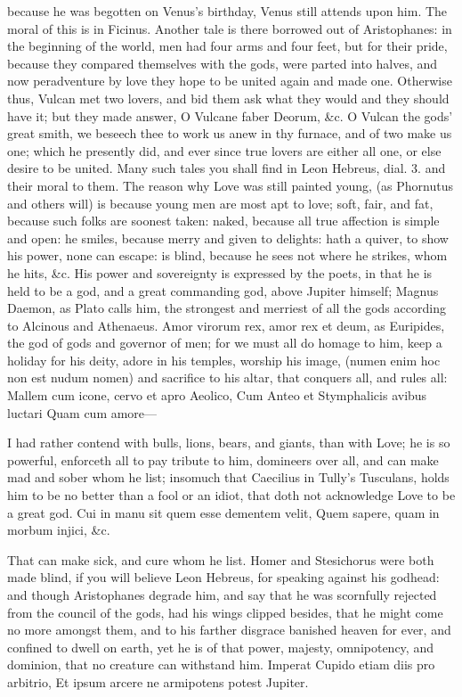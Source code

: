 {because he was begotten on Venus's birthday, Venus still attends upon
him. The moral of this is in Ficinus. Another tale is there
borrowed out of Aristophanes: in the beginning of the world, men
had four arms and four feet, but for their pride, because they compared
themselves with the gods, were parted into halves, and now peradventure
by love they hope to be united again and made one. Otherwise thus,
Vulcan met two lovers, and bid them ask what they would and they
should have it; but they made answer, O Vulcane faber Deorum, \&c. O
Vulcan the gods' great smith, we beseech thee to work us anew in thy
furnace, and of two make us one; which he presently did, and ever since
true lovers are either all one, or else desire to be united. Many such
tales you shall find in Leon Hebreus, dial. 3. and their moral to them.
The reason why Love was still painted young, (as Phornutus and
others will) is because young men are most apt to love; soft,
fair, and fat, because such folks are soonest taken: naked, because all
true affection is simple and open: he smiles, because merry and given
to delights: hath a quiver, to show his power, none can escape: is
blind, because he sees not where he strikes, whom he hits, \&c. His
power and sovereignty is expressed by the poets, in that he is
held to be a god, and a great commanding god, above Jupiter himself;
Magnus Daemon, as Plato calls him, the strongest and merriest of all
the gods according to Alcinous and Athenaeus. Amor virorum rex,
amor rex et deum, as Euripides, the god of gods and governor of men;
for we must all do homage to him, keep a holiday for his deity, adore
in his temples, worship his image, (numen enim hoc non est nudum nomen)
and sacrifice to his altar, that conquers all, and rules all:
Mallem cum icone, cervo et apro Aeolico,
Cum Anteo et Stymphalicis avibus luctari
Quam cum amore---

I had rather contend with bulls, lions, bears, and giants, than with
Love; he is so powerful, enforceth all to pay tribute to him,
domineers over all, and can make mad and sober whom he list; insomuch
that Caecilius in Tully's Tusculans, holds him to be no better than a
fool or an idiot, that doth not acknowledge Love to be a great god.
Cui in manu sit quem esse dementem velit,
Quem sapere, quam in morbum injici, \&c.

That can make sick, and cure whom he list. Homer and Stesichorus were
both made blind, if you will believe Leon Hebreus, for speaking
against his godhead: and though Aristophanes degrade him, and say that
he was scornfully rejected from the council of the gods, had his
wings clipped besides, that he might come no more amongst them, and to
his farther disgrace banished heaven for ever, and confined to dwell on
earth, yet he is of that power, majesty, omnipotency, and
dominion, that no creature can withstand him.
Imperat Cupido etiam diis pro arbitrio,
Et ipsum arcere ne armipotens potest Jupiter.

}

